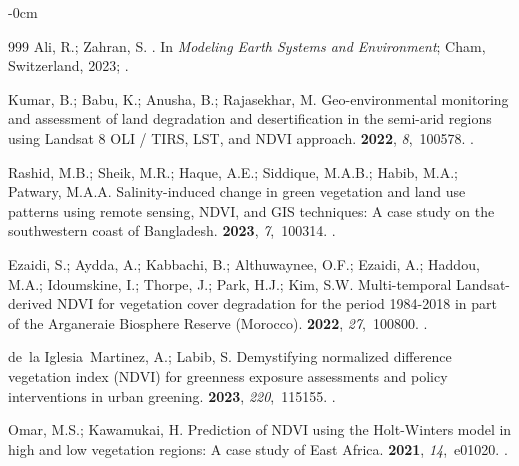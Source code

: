 \documentclass[jimaging,article,accept,pdftex,moreauthors]{Definitions/mdpi}
\begin{document}
\begin{adjustwidth}{-\extralength}{0cm}
\begin{thebibliography}{999}
Ali, R.; Zahran, S.
.
\newblock In {\em Modeling Earth Systems and Environment}; Cham, Switzerland, 2023; %
.

Kumar, B.; Babu, K.; Anusha, B.; Rajasekhar, M.
\newblock Geo-environmental monitoring and assessment of land degradation and
  desertification in the semi-arid regions using Landsat 8 OLI / TIRS, LST, and
  NDVI approach.
 {\bf 2022}, {\em 8},~100578.
.

Rashid, M.B.; Sheik, M.R.; Haque, A.E.; Siddique, M.A.B.; Habib, M.A.; Patwary,
  M.A.A.
\newblock Salinity-induced change in green vegetation and land use patterns
  using remote sensing, NDVI, and GIS techniques: A case study on the
  southwestern coast of Bangladesh.
 {\bf
  2023}, {\em 7},~100314.
.

Ezaidi, S.; Aydda, A.; Kabbachi, B.; Althuwaynee, O.F.; Ezaidi, A.; Haddou,
  M.A.; Idoumskine, I.; Thorpe, J.; Park, H.J.; Kim, S.W.
\newblock Multi-temporal Landsat-derived NDVI for vegetation cover degradation
  for the period 1984-2018 in part of the Arganeraie Biosphere Reserve
  (Morocco).
 {\bf
  2022}, {\em 27},~100800.
.

de~la Iglesia~Martinez, A.; Labib, S.
\newblock Demystifying normalized difference vegetation index (NDVI) for
  greenness exposure assessments and policy interventions in urban greening.
 {\bf 2023}, {\em 220},~115155.
.

Omar, M.S.; Kawamukai, H.
\newblock Prediction of NDVI using the Holt-Winters model in high and low
  vegetation regions: A case study of East Africa.
 {\bf 2021}, {\em 14},~e01020.
.


\end{thebibliography}
\end{adjustwidth}
\end{document}
